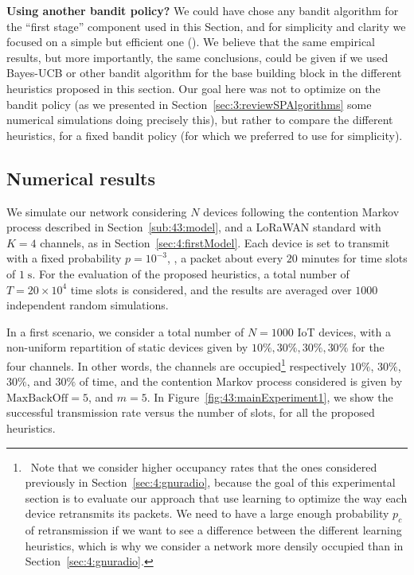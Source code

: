 \textbf{Using another bandit policy?}
%
We could have chose any bandit algorithm for the ``first stage'' component used in this Section, and for simplicity and clarity we focused on a simple but efficient one (\UCB).
We believe that the same empirical results, but more importantly, the same conclusions, could be given if we used Bayes-UCB or other bandit algorithm for the base building block in the different heuristics proposed in this section.
Our goal here was not to optimize on the bandit policy (as we presented in Section~\ref{sec:3:reviewSPAlgorithms} some numerical simulations doing precisely this), but rather to compare the different heuristics, for a fixed bandit policy (for which we preferred to use \UCB{} for simplicity).


\subsection{Numerical results}
\label{sub:43:numExp}

We simulate our network considering $N$ devices following the contention Markov process described in Section~\ref{sub:43:model}, and a LoRaWAN standard with $K=4$ channels, as in Section~\ref{sec:4:firstModel}.
Each device is set to transmit with a fixed probability $p=10^{-3}$, \ie, a packet about every $20$ minutes for time slots of $1\;\mathrm{s}$.
%
For the evaluation of the proposed heuristics, a total number of $T=20 \times 10^4$ time slots is considered, and the results are averaged over $1000$ independent random simulations.

In a first scenario, we consider a total number of $N=1000$ IoT devices, with a non-uniform repartition of static devices given by $10\%,30\%,30\%,30\%$ for the four channels.
In other words, the channels are occupied\footnote{~Note that we consider higher occupancy rates that the ones considered previously in Section~\ref{sec:4:gnuradio}, because the goal of this experimental section is to evaluate our approach that use learning to optimize the way each device retransmits its packets. We need to have a large enough probability $p_c$ of retransmission if we want to see a difference between the different learning heuristics, which is why we consider a network more densily occupied than in Section~\ref{sec:4:gnuradio}.}
respectively $10\%$, $30\%$, $30\%$, and $30\%$ of time, and the contention Markov process considered is given by $\mathrm{MaxBackOff} = 5$, and $m=5$.
In Figure~\ref{fig:43:mainExperiment1}, we show the successful transmission rate versus the number of slots, for all the proposed heuristics.

